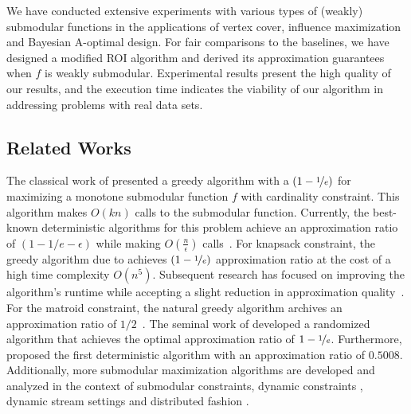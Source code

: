 \documentclass[10pt]{article} %
\theoremstyle{remark}
\begin{document}
We have conducted extensive experiments with various types of (weakly) submodular functions in the applications of vertex cover, influence maximization and Bayesian A-optimal design. For fair comparisons to the baselines, we have designed a modified ROI algorithm and derived its approximation guarantees when $f$ is weakly submodular. Experimental results present the high quality of our results, and the execution time indicates the viability of our algorithm in addressing problems with real data sets. 


\subsection{Related Works} 
The classical work of \citet{nemhauser1978analysis} presented a greedy algorithm with a $(1-\nicefrac{1}{e})$ for maximizing a monotone submodular function $f$ with cardinality constraint. 
This algorithm makes $O(kn)$ calls to the submodular function. 
Currently, the best-known deterministic algorithms for this problem achieve an approximation ratio of $(1-1/e-\epsilon)$ while making $O(\frac{n}{\epsilon})$ calls~\cite{li2022submodular,Kuhnle21}.
For knapsack constraint,  the greedy algorithm due to \citet{sviridenko2004note} achieves $(1-\nicefrac{1}{e})$ approximation ratio at the cost of a high time complexity $O(n^5)$. Subsequent research has focused on improving the algorithm's runtime while accepting a slight reduction in approximation quality~\cite{badanidiyuru2014fast, ene2017nearly, feldman2020practical,yaroslavtsev2020bring, li2022submodular,zhu2024improved}. For the matroid constraint, the natural greedy algorithm archives an approximation ratio of $1/2$~\cite{nemhauser1978analysis}. The seminal work of \citet{calinescu2011maximizing} developed a randomized algorithm that achieves the optimal approximation ratio of $1-\nicefrac{1}{e}$. Furthermore, \citet{buchbinder2019deterministic} proposed the first deterministic algorithm with an approximation ratio of $0.5008$.  Additionally, more submodular maximization algorithms are developed and analyzed in the context of submodular constraints, dynamic constraints \cite{roostapour2022pareto,bian2021fast},  dynamic stream settings \cite{lattanzi2020fully,dutting2022deletion} and  distributed fashion \cite{bateni2018optimal,fahrbach2019submodular,zhang2023communication}.
\end{document}
